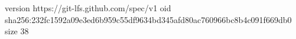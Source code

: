 version https://git-lfs.github.com/spec/v1
oid sha256:232fc1592a09e3ed6b959c55df9634bd345afd80ac760966bc8b4c091f669db0
size 38
